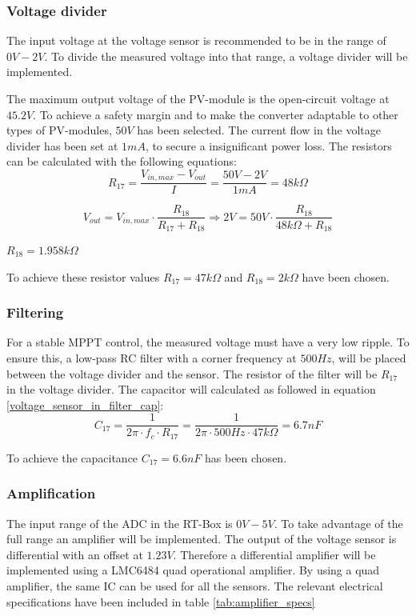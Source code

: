 \subsubsection{Voltage divider}
The input voltage at the voltage sensor is recommended to be in the range of $0V-2V$. To divide the measured voltage into that range, a voltage divider will be implemented. 

The maximum output voltage of the PV-module is the open-circuit voltage at $45.2V$. To achieve a safety margin and to make the converter adaptable to other types of PV-modules, $50V$ has been selected. The current flow in the voltage divider has been set at $1mA$, to secure a insignificant power loss. The resistors can be calculated with the following equations:
\begin{equation} \label{voltage_divider_R17_in}
	R_{17} = \frac{V_{in,max}-V_{out}}{I} = \frac{50V-2V}{1mA} = 48k\Omega
\end{equation}

\begin{equation} \label{voltage_divider_R18_in}
	V_{out} = V_{in,max} \cdot \frac{R_{18}}{R_{17}+R_{18}} \Rightarrow 2V = 50V \cdot \frac{R_{18}}{48k\Omega+R_{18}}
\end{equation}
\begin{center}
	$R_{18} = 1.958k\Omega$
\end{center}

To achieve these resistor values $R_{17} = 47k\Omega$ and $R_{18} = 2k\Omega$ have been chosen. 

\subsubsection{Filtering} \label{voltage_sensor_filter}
For a stable MPPT control, the measured voltage must have a very low ripple. To ensure this, a low-pass RC filter with a corner frequency at $500Hz$, will be placed between the voltage divider and the sensor. The resistor of the filter will be $R_{17}$ in the voltage divider. The capacitor will calculated as followed in equation \ref{voltage_sensor_in_filter_cap}:
\begin{equation} \label{voltage_sensor_in_filter_cap}
	C_{17} = \frac{1}{2\pi \cdot f_c \cdot R_{17}} = \frac{1}{2 \pi \cdot 500Hz \cdot 47k\Omega} = 6.7nF
\end{equation}

To achieve the capacitance $C_{17} = 6.6nF$ has been chosen. 

\subsubsection{Amplification} \label{voltage_sensor_amplification}
The input range of the ADC in the RT-Box is $0V-5V$. To take advantage of the full range an amplifier will be implemented. The output of the voltage sensor is differential with an offset at $1.23V$. Therefore a differential amplifier will be implemented using a LMC6484 quad operational amplifier. By using a quad amplifier, the same IC can be used for all the sensors. The relevant electrical specifications have been included in table \ref{tab:amplifier_specs}


